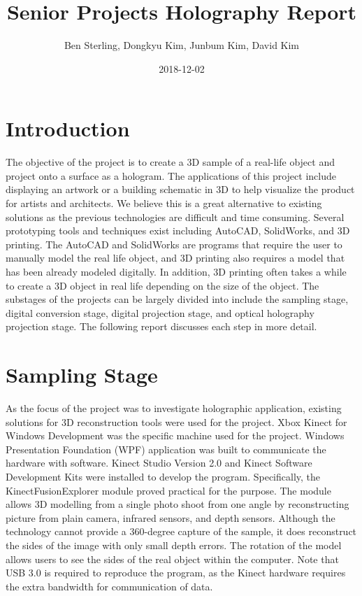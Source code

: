 \documentclass{article}
\title{Senior Projects Holography Report}
\date{2018-12-02}
\author{Ben Sterling, Dongkyu Kim, Junbum Kim, David Kim}
\begin{document}
\maketitle
\clearpage

\section{Introduction}

The objective of the project is to create a 3D sample of a real-life object and project onto a surface as a hologram. The applications of this project include displaying an artwork or a building schematic in 3D to help visualize the product for artists and architects. We believe this is a great alternative to existing solutions as the previous technologies are difficult and time consuming. Several prototyping tools and techniques exist including AutoCAD, SolidWorks, and 3D printing. The AutoCAD and SolidWorks are programs that require the user to manually model the real life object, and 3D printing also requires a model that has been already modeled digitally. In addition, 3D printing often takes a while to create a 3D object in real life depending on the size of the object. The substages of the projects can be largely divided into include the sampling stage, digital conversion stage, digital projection stage, and optical holography projection stage. The following report discusses each step in more detail.

\section{Sampling Stage}

As the focus of the project was to investigate holographic application, existing solutions for 3D reconstruction tools were used for the project. Xbox Kinect for Windows Development was the specific machine used for the project. Windows Presentation Foundation (WPF) application was built to communicate the hardware with software. Kinect Studio Version 2.0 and Kinect Software Development Kits were installed to develop the program. Specifically, the KinectFusionExplorer module proved practical for the purpose. The module allows 3D modelling from a single photo shoot from one angle by reconstructing picture from plain camera, infrared sensors, and depth sensors. Although the technology cannot provide a 360-degree capture of the sample, it does reconstruct the sides of the image with only small depth errors. The rotation of the model allows users to see the sides of the real object within the computer. Note that USB 3.0 is required to reproduce the program, as the Kinect hardware requires the extra bandwidth for communication of data. 
\end{document}
